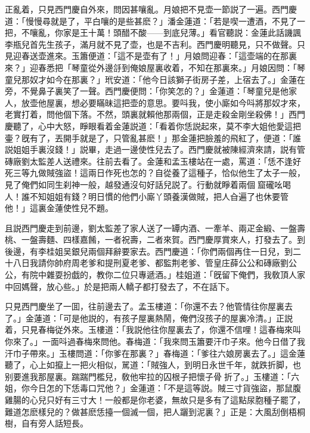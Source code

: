 正亂着，只見西門慶自外來，問因甚嚷亂。月娘把不見壶一節説了一遍。西門慶道：「慢慢尋就是了，平白嚷的是些甚麽？」潘金蓮道：「若是喫一遭酒，不見了一把，不嚷亂，你家是王十萬！頭醋不酸——到底兒薄。」看官聽説：金蓮此話譏諷李瓶兒首先生孩子，滿月就不見了壶，也是不吉利。西門慶明聽見，只不做聲。只見迎春送壶進來。玉簫便道：「這不是壶有了！」月娘問迎春：「這壶端的在那裏來？」迎春悉把「琴童從外邊㧱到俺娘屋裏收着，不知在那裏來。」月娘因問：「琴童兒那奴才如今在那裏？」玳安道：「他今日該獅子街房子差，上宿去了。」金蓮在旁，不覺鼻子裏笑了一聲。西門慶便問：「你笑怎的？」金蓮道：「琴童兒是他家人，放壶他屋裏，想必要瞞昧這把壶的意思。要呌我，使小廝如今呌將那奴才來，老實打着，問他個下落。不然，頭裏就賴他那兩個，正是走殺金剛坐殺佛！」西門慶聽了，心中大怒，睜眼看着金蓮説道：「看着你恁説起來，莫不李大姐他愛這把壷？旣有了，丟開手就是了，只管亂甚麽！」那金蓮把臉羞的飛紅了，便道：「誰説姐姐手裏沒錢！」説畢，走過一邊使性兒去了。西門慶就被陳經濟來請，説有管磚廠劉太監差人送禮來。往前去看了。金蓮和孟玉樓站在一處，罵道：「恁不逢好死三等九做賊強盜！這兩日作死也怎的？自從養了這種子，恰似他生了太子一般，見了俺們如同生刹神一般，越發通沒句好話兒説了。行動就睜着兩個𣭈窟礲吆喝人！誰不知姐姐有錢？明日慣的他們小廝丫頭養漢做賊，把人㒲遍了也休要管他！」這裏金蓮使性兒不題。

且説西門慶走到前邊，劉太監差了家人送了一罈内酒、一牽羊、兩疋金緞、一盤壽桃、一盤壽麵、四樣嘉餚，一者祝壽，二者來賀。西門慶厚賞來人，打發去了。到後邊，有李桂姐吴銀兒兩個拜辭要家去。西門慶道：「你們兩個再住一日兒，到二十八日我請你帥府周老爹和提刑夏老爹、都監荆老爹、管皇庄薛公公和磚廠劉公公，有院中雜耍扮戯的，教你二位只專遞酒。」桂姐道：「旣留下俺們，我敎頂人家中回媽聲，放心些。」於是把兩人轎子都打發去了，不在話下。

只見西門慶坐了一囬，往前邊去了。孟玉樓道：「你還不去？他管情往你屋裏去了。」金蓮道：「可是他説的，有孩子屋裏熱鬧，俺們沒孩子的屋裏冷清。」正説着，只見春梅従外來。玉樓道：「我説他往你屋裏去了，你還不信哩！這春梅來叫你來了。」一面呌過春梅來問他。春梅道：「我來問玉簫要汗巾子來。他今日借了我汗巾子帶來。」玉樓問道：「你爹在那裏？」春梅道：「爹往六娘房裏去了。」這金蓮聽了，心上如攛上一把火相似，駡道：「賊強人，到明日永世千年，就跌折脚，也别要進我那屋裏。踹踹門檻兒，敎他牢拉的囚根子把懷子骨𢱉折了。」玉樓道：「六姐，你今日怎的下恁毒口咒他？」金蓮道：「不是這等説。賊三寸貨強盜，那鼠腹雞腸的心兒只好有三寸大！一般都是你老婆，無故只是多有了這點尿胞種子罷了，難道怎麽樣兒的？做甚麽恁擡一個滅一個，把人躧到泥裏？」正是：大風刮倒梧桐樹，自有旁人話短長。

